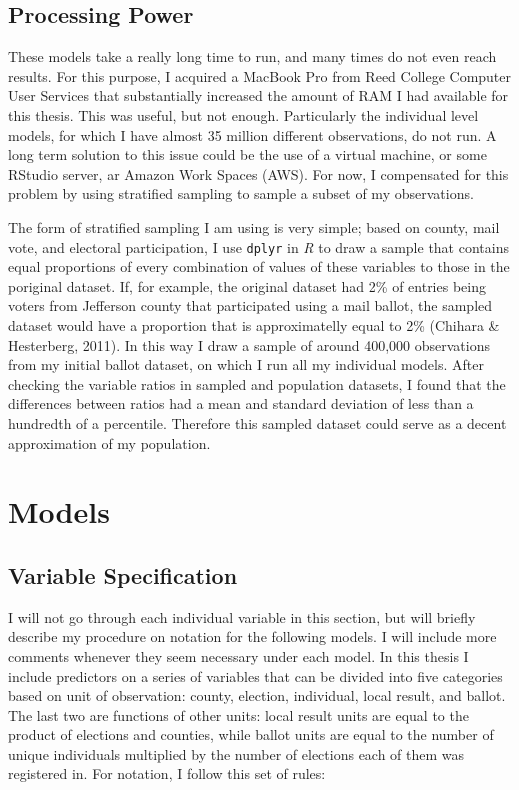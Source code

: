 \documentclass[12pt,twoside]{reedthesis}
\begin{document}
  \subsection{Processing Power}\label{processing-power}
  
  These models take a really long time to run, and many times do not even
  reach results. For this purpose, I acquired a MacBook Pro from Reed
  College Computer User Services that substantially increased the amount
  of RAM I had available for this thesis. This was useful, but not enough.
  Particularly the individual level models, for which I have almost 35
  million different observations, do not run. A long term solution to this
  issue could be the use of a virtual machine, or some RStudio server, ar
  Amazon Work Spaces (AWS). For now, I compensated for this problem by
  using stratified sampling to sample a subset of my observations.
  
  The form of stratified sampling I am using is very simple; based on
  county, mail vote, and electoral participation, I use \texttt{dplyr} in
  \textit{R} to draw a sample that contains equal proportions of every
  combination of values of these variables to those in the poriginal
  dataset. If, for example, the original dataset had 2\% of entries being
  voters from Jefferson county that participated using a mail ballot, the
  sampled dataset would have a proportion that is approximatelly equal to
  2\% (Chihara \& Hesterberg, 2011). In this way I draw a sample of around
  400,000 observations from my initial ballot dataset, on which I run all
  my individual models. After checking the variable ratios in sampled and
  population datasets, I found that the differences between ratios had a
  mean and standard deviation of less than a hundredth of a percentile.
  Therefore this sampled dataset could serve as a decent approximation of
  my population.
  
  \section{Models}\label{models}
  
  \subsection{Variable Specification}\label{variable-specification}
  
  I will not go through each individual variable in this section, but will
  briefly describe my procedure on notation for the following models. I
  will include more comments whenever they seem necessary under each
  model. In this thesis I include predictors on a series of variables that
  can be divided into five categories based on unit of observation:
  county, election, individual, local result, and ballot. The last two are
  functions of other units: local result units are equal to the product of
  elections and counties, while ballot units are equal to the number of
  unique individuals multiplied by the number of elections each of them
  was registered in. For notation, I follow this set of rules:
  
\end{document}
